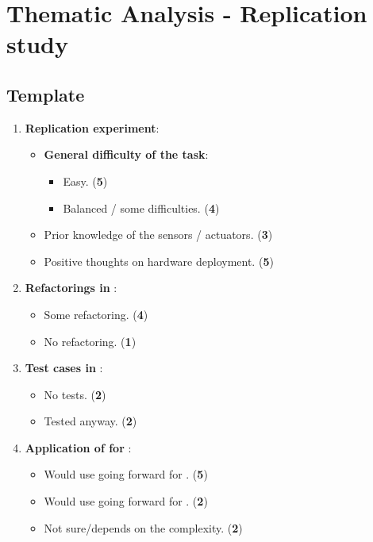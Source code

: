 \chapter{Thematic Analysis - Replication study}

\section{Template}
\begin{enumerate}
    \item \textbf{Replication experiment}:
    \begin{itemize}
        \item \textbf{General difficulty of the task}:
        \begin{itemize}
            \item Easy. (\textbf{5})
            \item Balanced / some difficulties. (\textbf{4})
        \end{itemize}
        \item Prior knowledge of the sensors / actuators. (\textbf{3})
        \item Positive thoughts on hardware deployment. (\textbf{5})
    \end{itemize}

    \item \textbf{Refactorings in \tdd}:
    \begin{itemize}
        \item Some refactoring. (\textbf{4})
        \item No refactoring. (\textbf{1})
    \end{itemize}

    \item \textbf{Test cases in \notdd}:
    \begin{itemize}
        \item No tests. (\textbf{2})
        \item Tested anyway. (\textbf{2})
    \end{itemize}

    \item \textbf{Application of \tdd for \ess}:
    \begin{itemize}
        \item Would use \tdd going forward for \ess. (\textbf{5})
        \item Would use \notdd going forward for \ess. (\textbf{2})
        \item Not sure/depends on the complexity. (\textbf{2})
    \end{itemize}


\end{enumerate}
